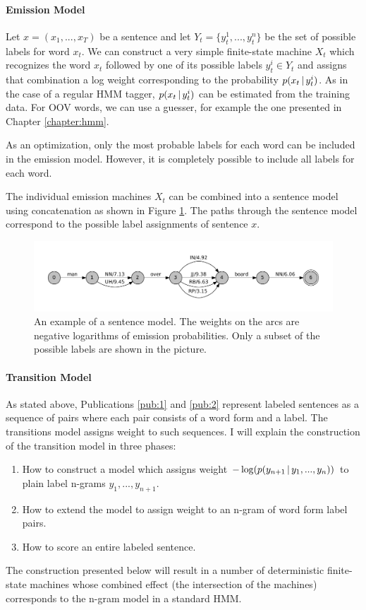 \paragraph{Emission Model} Let $x = (x_1, ..., x_T)$ be a sentence and
let $Y_t = \{y_t^1, ..., y_t^n\}$ be the set of possible labels for
word $x_t$. We can construct a very simple finite-state machine
$X_t$ which recognizes the word $x_t$ followed by one of its possible labels
$y_t^i \in Y_t$ and assigns that combination a log weight corresponding
to the probability $p(x_t\mbox{$ \, | \, $} y_t^i)$. As in the case of a regular HMM tagger,
$p(x_t\mbox{$ \, | \, $} y_t^i)$ can be estimated from the training data. For OOV words,
we can use a guesser, for example the one presented in Chapter
\ref{chapter:hmm}.

As an optimization, only the most probable labels for each word can be
included in the emission model. However, it is completely possible to
include all labels for each word.

The individual emission machines $X_t$ can be combined into a sentence
model using concatenation as shown in Figure
\ref{fig:sentence-model}. The paths through the sentence model
correspond to the possible label assignments of sentence $x$.

\begin{figure}[!htb]
\includegraphics[scale=0.5]{sentence_model}
\caption{An example of a sentence model. The weights on the arcs are
  negative logarithms of emission probabilities. Only a subset of the
  possible labels are shown in the picture.}\label{fig:sentence-model}
\end{figure}

\paragraph{Transition Model} As stated above, Publications \ref{pub:1}
and \ref{pub:2} represent labeled sentences as a sequence of pairs
where each pair consists of a word form and a label. The transitions
model assigns weight to such sequences. I will explain the
construction of the transition model in three phases:
\begin{enumerate}
\item How to construct a model which assigns weight $-\log(p(y_{n+1}\mbox{$ \, | \, $}
y_{1}, ..., y_{n}))$ to plain label n-grams $y_1, ..., y_{n+1}$.
\item How to extend the model to assign weight to an n-gram of word form label pairs.
\item How to score an entire labeled sentence.
\end{enumerate}
The construction presented below will result in a number of
deterministic finite-state machines whose combined effect (the
intersection of the machines) corresponds to the n-gram model in a
standard HMM.

